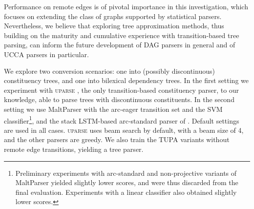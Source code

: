 \documentclass[11pt,a4paper]{article}
\newcommand{\parser}[1]{TUPA\textsubscript{#1}}
\begin{document}
Performance on remote edges is of pivotal importance in this investigation, which focuses on extending the class of graphs supported by statistical parsers. Nevertheless, we believe that exploring tree approximation methods, thus building on the maturity and cumulative experience with transition-based tree parsing, can inform the future development of DAG parsers in general and of UCCA parsers in particular.

We explore two conversion scenarios: one into (possibly discontinuous) constituency trees,
and one into bilexical dependency trees. In the first setting we experiment with \textsc{uparse}
\cite{maier-lichte:2016:DiscoNLP},
the only transition-based constituency parser, to our knowledge, able to parse trees with
discontinuous constituents.
In the second setting we use MaltParser \cite{nivre2007maltparser} with the
arc-eager transition set and the SVM classifier\footnote{Preliminary
experiments with arc-standard and non-projective variants of MaltParser yielded slightly
lower scores, and were thus discarded from the final evaluation.
Experiments with a linear classifier also obtained slightly lower scores.},
and the stack LSTM-based arc-standard parser of \citet{dyer2015transition}.
Default settings are used in all cases.
\textsc{uparse} uses beam search by default,
with a beam size of 4, and the other parsers are greedy.
We also train the \parser{} variants without remote edge transitions, yielding a tree parser.
\end{document}
